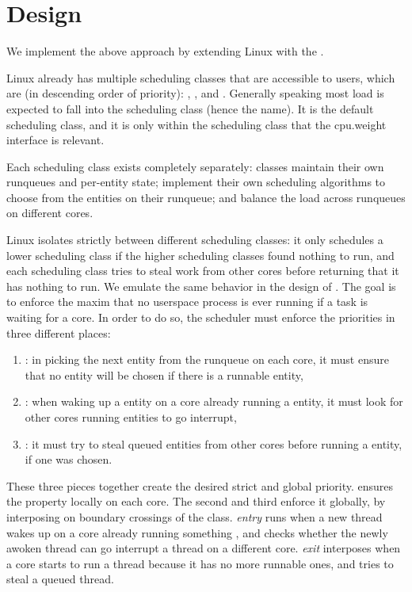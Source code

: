 \section{\beclass{} Design}\label{s:design}

We implement the above approach by extending Linux with the \beclass{}.

Linux already has multiple scheduling classes that are accessible to users,
which are (in descending order of priority): \deadlineclass{}, \fifoclass{}, and
\normalclass{}. Generally speaking most load is expected to fall into the
\normalclass{} scheduling class (hence the name). It is the default scheduling
class, and it is only within the \normalclass{} scheduling class that the
\cgroups{} cpu.weight interface is relevant.

Each scheduling class exists completely separately: classes maintain their own
runqueues and per-entity state; implement their own scheduling algorithms to
choose from the entities on their runqueue; and balance the load across
runqueues on different cores.

Linux isolates strictly between different scheduling classes: it only schedules
a lower scheduling class if the higher scheduling classes found nothing to run,
and each scheduling class tries to steal work from other cores before returning
that it has nothing to run. We emulate the same behavior in the design of
\beclass{}. The goal is to enforce the maxim that no \beclass{} userspace
process is ever running if a \normalclass{} task is waiting for a core. In order
to do so, the scheduler must enforce the priorities in three different places:
\begin{enumerate}
    \item \local: in picking the next entity from the runqueue on each core, it
        must ensure that no \beclass{} entity will be chosen if there is a
        runnable \normalclass{} entity,
    \item \entry: when waking up a \normalclass{} entity on a core already
        running a \normalclass{} entity, it must look for other cores running
        \beclass{} entities to go interrupt,
    \item \exit: it must try to steal queued \normalclass{} entities from other
        cores before running a \beclass{} entity, if one was chosen.
\end{enumerate}

These three pieces together create the desired strict and global priority.
\local{} ensures the property locally on each core. The second and third enforce
it globally, by interposing on boundary crossings of the \normalclass{} class.
\textit{entry} runs when a new \normalclass{} thread wakes up on a core already
running something \normalclass{}, and checks whether the newly awoken thread can
go interrupt a \beclass{} thread on a different core. \textit{exit} interposes
when a core starts to run a \beclass{} thread because it has no more runnable
\normalclass{} ones, and tries to steal a queued \normalclass{} thread. 

